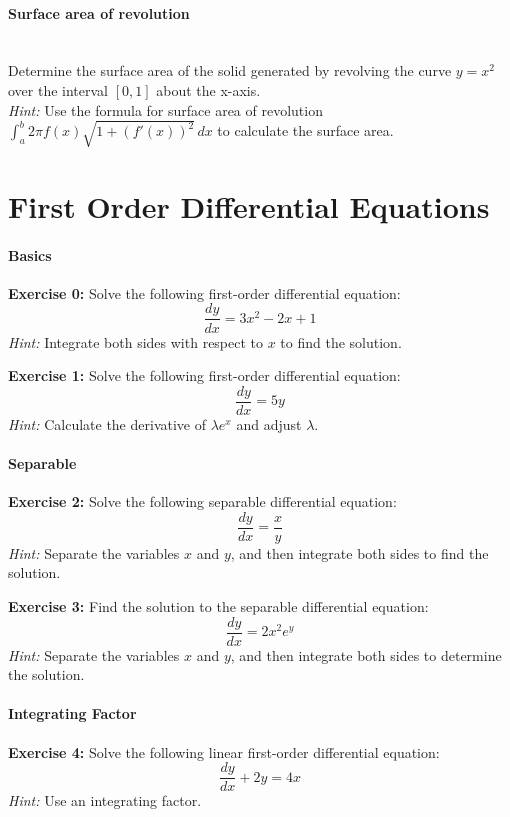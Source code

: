 \documentclass[]{article}
\begin{document}
	\paragraph{Surface area of revolution}\mbox{}\\
	Determine the surface area of the solid generated by revolving the curve \(y = x^2\) over the interval \([0, 1]\) about the x-axis.\\
	\textit{Hint:} Use the formula for surface area of revolution \(\int_a^b 2\pi f(x) \sqrt{1 + (f'(x))^2} \, dx\) to calculate the surface area.
	
	
	\section{First Order Differential Equations}
	\paragraph{Basics}\mbox{}
	
	\textbf{Exercise 0:}
	Solve the following first-order differential equation:
	\[
	\frac{dy}{dx} = 3x^2 - 2x + 1
	\]
	\textit{Hint:} Integrate both sides with respect to \(x\) to find the solution.
	
	\textbf{Exercise 1:}
	Solve the following first-order differential equation:
	\[
	\frac{dy}{dx} = 5y
	\]
	\textit{Hint:} Calculate the derivative of $\lambda e^x$ and adjust $\lambda$.
	
	\paragraph{Separable}\mbox{}
	
	\textbf{Exercise 2:}
	Solve the following separable differential equation:
	\[
	\frac{dy}{dx} = \frac{x}{y}
	\]
	\textit{Hint:} Separate the variables \(x\) and \(y\), and then integrate both sides to find the solution.
	
	\textbf{Exercise 3:}
	Find the solution to the separable differential equation:
	\[
	\frac{dy}{dx} = 2x^2 e^y
	\]
	\textit{Hint:} Separate the variables \(x\) and \(y\), and then integrate both sides to determine the solution.
	
	\paragraph{Integrating Factor}\mbox{}
	
	\textbf{Exercise 4:}
	Solve the following linear first-order differential equation:
	\[
	\frac{dy}{dx} + 2y = 4x
	\]
	\textit{Hint:} Use an integrating factor.
	
\end{document}
